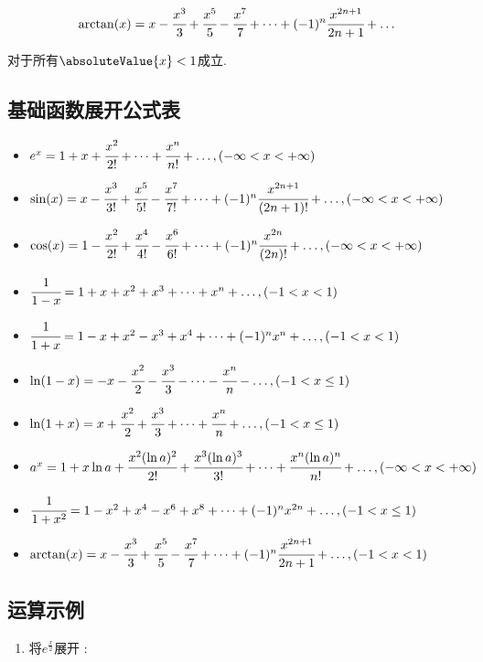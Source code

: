 {{{{{\begin{enumerate}
{          $$
            \arctan(x) = x - \cfrac{x^3}{3} + \cfrac{x^5}{5} - \cfrac{x^7}{7} + \dots + (-1)^n\cfrac{x^{2n + 1}}{2n + 1} + \dots
          $$

          对于所有$\absoluteValue{x} < 1$成立.
          }
  \end{enumerate}
}%

\subsection{基础函数展开公式表}{
  \begin{itemize}
    \item $e^x = 1 + x + \cfrac{x^2}{2!} + \dots + \cfrac{x^n}{n!} + \dots,(-\infty < x < +\infty)$
    \item $\sin(x) = x - \cfrac{x^3}{3!} + \cfrac{x^5}{5!} - \cfrac{x^7}{7!} + \dots + (-1)^n\cfrac{x^{2n + 1}}{(2n + 1)!} + \dots,(-\infty < x < +\infty)$
    \item $\cos(x) = 1 - \cfrac{x^2}{2!} + \cfrac{x^4}{4!} - \cfrac{x^6}{6!} + \dots + (-1)^n\cfrac{x^{2n}}{(2n)!} + \dots,(-\infty < x < +\infty)$
    \item $\cfrac{1}{1 - x} = 1 + x + x^2 + x^3 + \dots + x^n + \dots,(-1 < x < 1)$
    \item $\cfrac{1}{1 + x} = 1 - x + x^2 - x^3 + x^4 + \dots + (-1)^nx^n + \dots,(-1 < x < 1)$
    \item $\ln(1 - x) = -x - \cfrac{x^2}{2} - \cfrac{x^3}{3} - \dots - \cfrac{x^n}{n} - \dots,(-1 < x \leq 1)$
    \item $\ln(1 + x) = x + \cfrac{x^2}{2} + \cfrac{x^3}{3} + \dots + \cfrac{x^n}{n} + \dots,(-1 < x \leq 1)$
    \item $a^x = 1 + x\ln a + \cfrac{x^2(\ln a)^2}{2!} + \cfrac{x^3(\ln a)^3}{3!} + \dots + \cfrac{x^n(\ln a)^n}{n!} + \dots,(-\infty < x < +\infty)$
    \item $\cfrac{1}{1 + x^2} = 1 - x^2 + x^4 - x^6 + x^8 + \dots + (-1)^nx^{2n} + \dots,(-1 < x \leq 1)$
    \item $\arctan(x) = x - \cfrac{x^3}{3} + \cfrac{x^5}{5} - \cfrac{x^7}{7} + \dots + (-1)^n\cfrac{x^{2n + 1}}{2n + 1} + \dots,(-1 < x < 1)$
  \end{itemize}
}%

\subsection{运算示例}{
  \begin{enumerate}
    \item {
          将$e^{\frac{x}{2}}$展开 :

}
\end{enumerate}}}}}}
